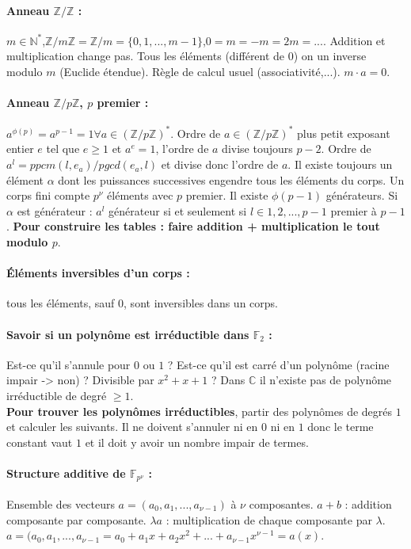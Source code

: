 \documentclass[11pt,a4paper]{report}
\newcommand{\z}{\mathbb{Z}}
\newcommand{\f}{\mathbb{F}}
\begin{document}
\paragraph*{Anneau $\mathbb{Z}/\mathbb{Z}$ :} $m\in\mathbb{N}^*$,$\z/m\z=\z/m=\{0,1,...,m-1\}$,$0=m=-m=2m=...$. Addition et multiplication change pas. Tous les éléments (différent de $0$) on un inverse modulo $m$ (Euclide étendue). Règle de calcul usuel (associativité,...). $m\cdot a = 0$.

\paragraph*{Anneau $\z/p\z$, $p$ premier :} $a^{\phi(p)}=a^{p-1}=1 \forall a \in (\z/p\z)^*$. Ordre de $a\in(\z/p\z)^*$ plus petit exposant entier $e$ tel que $e\geq1$ et $a^e=1$, l'ordre de $a$ divise toujours $p-2$. Ordre de $a^l = ppcm(l,e_a)/pgcd(e_a,l)$ et divise donc l'ordre de $a$. Il existe toujours un élément $\alpha$ dont les puissances successives engendre tous les éléments du corps. Un corps fini compte $p^\nu$ éléments avec $p$ premier. Il existe $\phi(p-1)$ générateurs. Si $\alpha$ est générateur : $a^l$ générateur si et seulement si $l\in{1,2,...,p-1}$ premier à $p-1$. \textbf{Pour construire les tables : faire addition + multiplication le tout modulo $p$}.

\paragraph*{Éléments inversibles d'un corps :} tous les éléments, sauf $0$, sont inversibles dans un corps.

\paragraph*{Savoir si un polynôme est irréductible dans $\f_2$ :} Est-ce qu'il s'annule pour $0$ ou $1$ ? Est-ce qu'il est carré d'un polynôme (racine impair -> non) ? Divisible par $x^2+x+1$ ? Dans $\mathbb{C}$ il n'existe pas de polynôme irréductible de degré $\geq 1$.\\
\textbf{Pour trouver les polynômes irréductibles}, partir des polynômes de degrés $1$ et calculer les suivants. Il ne doivent s'annuler ni en $0$ ni en $1$ donc le terme constant vaut $1$ et il doit y avoir un nombre impair de termes.

\paragraph*{Structure additive de $\mathbb{F}_{p^\nu}$ :} Ensemble des vecteurs $a=(a_0,a_1,...,a_{\nu-1})$ à $\nu$ composantes. $a+b$ : addition composante par composante. $\lambda a$ : multiplication de chaque composante par $\lambda$. $a=(a_0,a_1,...,a_{\nu-1}=a_0+a_1x+a_2x^2+...+a_{\nu-1}x^{\nu-1}=a(x)$.
\end{document}
